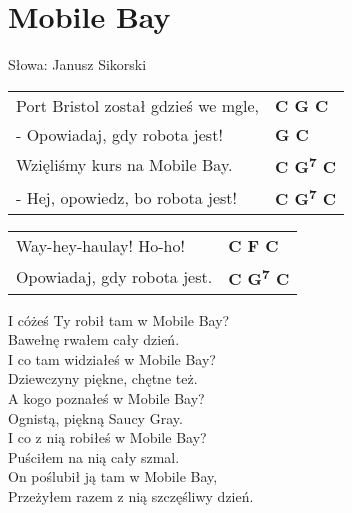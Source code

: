 \section{Mobile Bay}

Słowa: Janusz Sikorski

\vspace{2em}
\begin{tabular}{@{}p{7cm}@{}l@{}}
Port Bristol został gdzieś we mgle, & \bfseries C G C\\
- Opowiadaj, gdy robota jest! & \bfseries G C\\
Wzięliśmy kurs na Mobile Bay. & \bfseries C G\textsuperscript{7} C\\
- Hej, opowiedz, bo robota jest! & \bfseries C G\textsuperscript{7} C\\
\end{tabular}

\vspace{1em}
\begin{tabular}{@{}p{7cm}@{}l@{}}
Way-hey-haulay! Ho-ho! & \bfseries C F C\\
Opowiadaj, gdy robota jest. & \bfseries C G\textsuperscript{7} C\\
\end{tabular}

\vspace{1em}
I cóżeś Ty robił tam w Mobile Bay? \\
Bawełnę rwałem cały dzień. \\

I co tam widziałeś w Mobile Bay? \\
Dziewczyny piękne, chętne też. \\

A kogo poznałeś w Mobile Bay? \\
Ognistą, piękną Saucy Gray. \\

I co z nią robiłeś w Mobile Bay? \\
Puściłem na nią cały szmal. \\

On poślubił ją tam w Mobile Bay, \\
Przeżyłem razem z nią szczęśliwy dzień. \\